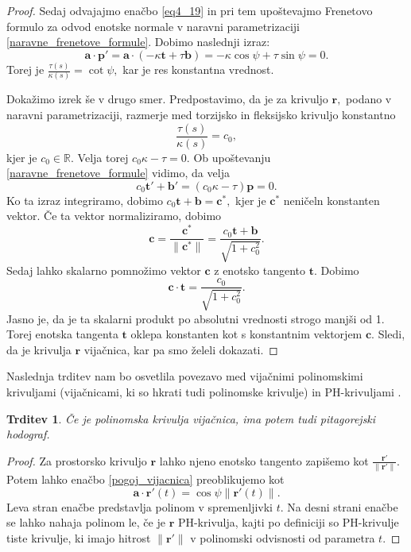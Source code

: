 \documentclass[12pt,a4paper,twoside]{article}
\theoremstyle{definition} %
\theoremstyle{plain} %
\newtheorem{trditev}[definicija]{Trditev}
\theoremstyle{primerstyle}
\numberwithin{equation}{section}  %
\newcommand{\R}{\mathbb R}
\newcommand{\tV}{\mathbf{t}}
\newcommand{\aV}{\mathbf{a}}
\newcommand{\bV}{\mathbf{b}}
\newcommand{\cV}{\mathbf{c}}
\newcommand{\pV}{\mathbf{p}}
\newcommand{\rV}{\mathbf{r}}
\begin{document}
\begin{proof}
	Sedaj odvajajmo enačbo \eqref{eq4_19} in pri tem upoštevajmo Frenetovo formulo za odvod enotske normale v naravni parametrizaciji \eqref{naravne_frenetove_formule}. Dobimo naslednji izraz:
	\begin{equation*}
		\aV \cdot \pV'=\aV \cdot (-\kappa \tV+\tau \bV)=-\kappa \cos \psi + \tau \sin \psi=0.
	\end{equation*}
	Torej je $\frac{\tau(s)}{\kappa(s)}=\cot \psi,$ kar je res konstantna vrednost.
	
	Dokažimo izrek še v drugo smer. Predpostavimo, da je za krivuljo $\rV,$ podano v naravni parametrizaciji, razmerje med torzijsko in fleksijsko krivuljo konstantno
	$$\frac{\tau(s)}{\kappa(s)}=c_0,$$
	kjer je $c_0\in\R.$ Velja torej $c_0\kappa-\tau=0.$ Ob upoštevanju \eqref{naravne_frenetove_formule} vidimo, da velja
	$$c_0\tV'+\bV'=(c_0\kappa-\tau)\pV=0.$$
	Ko ta izraz integriramo, dobimo $c_0\tV+\bV=\cV^*,$ kjer je $\cV^*$ neničeln konstanten vektor. Če ta vektor normaliziramo, dobimo
	$$\cV=\frac{\cV^*}{\lVert\cV^*\rVert}=\frac{c_0\tV+\bV}{\sqrt{1+c_0^2}}.$$
	Sedaj lahko skalarno pomnožimo vektor $\cV$ z enotsko tangento $\tV.$ Dobimo
	$$\cV\cdot\tV=\frac{c_0}{\sqrt{1+c_0^2}}.$$
	Jasno je, da je ta skalarni produkt po absolutni vrednosti strogo manjši od 1. Torej enotska tangenta $\tV$ oklepa konstanten kot s konstantnim vektorjem $\cV.$ Sledi, da je krivulja $\rV$ vijačnica, kar pa smo želeli dokazati.
\end{proof}
Naslednja trditev nam bo osvetlila povezavo med vijačnimi polinomskimi krivuljami (vijačnicami, ki so hkrati tudi polinomske krivulje) in PH-krivuljami \cite[str.\ 368]{faroukietal2004}.
\begin{trditev}
	\label{trditev_vijacnica_PH}
	Če je polinomska krivulja vijačnica, ima potem tudi pitagorejski hodograf.
\end{trditev}
\begin{proof}
	Za prostorsko krivuljo $\rV$ lahko njeno enotsko tangento zapišemo kot $\frac{\rV'}{\lVert \rV' \rVert}.$ Potem lahko enačbo \eqref{pogoj_vijacnica} preoblikujemo kot
	\begin{equation}
		\aV \cdot \rV'(t)=\cos \psi \lVert \rV'(t) \rVert.
	\end{equation}
	Leva stran enačbe predstavlja polinom v spremenljivki $t.$ Na desni strani enačbe se lahko nahaja polinom le, če je $\rV$ PH-krivulja, kajti po definiciji so PH-krivulje tiste krivulje, ki imajo hitrost $\lVert \rV' \rVert$ v polinomski odvisnosti od parametra $t.$
\end{proof}
\end{document}
